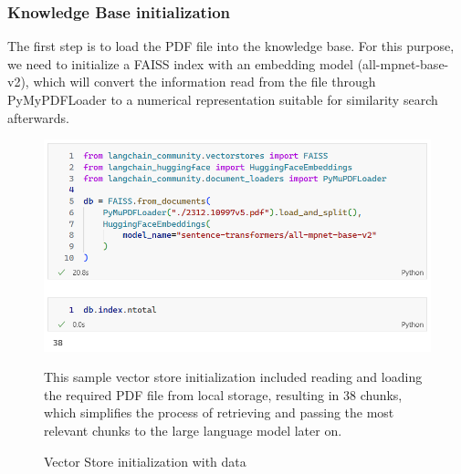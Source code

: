 \subsubsection{Knowledge Base initialization}
The first step is to load the PDF file into the knowledge base. For this purpose, we need to initialize a FAISS index with an embedding model (all-mpnet-base-v2), which will convert the information read from the file through PyMyPDFLoader to a numerical representation suitable for similarity search afterwards.
\begin{figure}[htbp]
    \centering
    \includegraphics[width=\linewidth]{./figures/vectorstore_init.png}
    \caption{Vector Store initialization with data}
    \begin{flushleft}
        \small This sample vector store initialization included reading and loading the required PDF file from local storage, resulting in 38 chunks, which simplifies the process of retrieving and passing the most relevant chunks to the large language model later on.
    \end{flushleft}
\end{figure}\newpage
